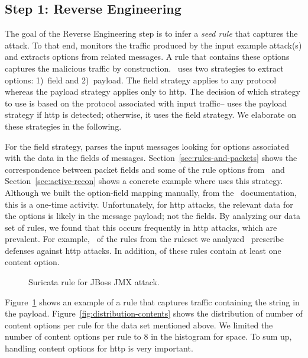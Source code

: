 \documentclass[conference]{IEEEtran}
\begin{document}
\subsection{Step 1: Reverse Engineering}
\label{sec:reverse-engineering}

The goal of the Reverse Engineering step is to infer a \emph{seed
  rule} that captures the attack. To that end, \tname{} monitors the
traffic produced by the input example attack(s) and extracts options
from related messages. A rule that contains these options captures the
malicious traffic by construction. \tname\ uses two strategies to
extract options: 1)~field and 2)~payload. The field strategy applies
to any protocol whereas the payload strategy applies only to http.
The decision of which strategy to use is based on the protocol
associated with input traffic--\tname{} uses the payload strategy if
http is detected; otherwise, it uses the field strategy. We elaborate
on these strategies in the following.

For the field strategy, \tname{} parses the input messages looking for
options associated with the data in the fields of
messages. Section~\ref{sec:rules-and-packets} shows the correspondence
between packet fields and some of the rule options from \suri\ and
Section~\ref{sec:active-recon} shows a concrete example where \tname{}
uses this strategy. Although we built the option-field mapping
manually, from the \suri\ documentation, this is a one-time activity.
Unfortunately, for http attacks, the relevant data for the options is
likely in the message payload; not the fields. By analyzing our data
set of rules, we found that this occurs frequently in http attacks,
which are prevalent. For example, \percHttp\ of the \numrulessuri{}
rules from the ruleset we analyzed~\cite{emerging-threats-open}
prescribe defenses against http attacks. In addition,
\percRulesWithContent{} of these rules contain at least one content
option.

\begin{figure}[h!]
  
  \vspace{-1ex}  
  \caption{Suricata rule for JBoss JMX attack.}
  \vspace{-2ex}  
  \label{fig:adaptor-golden-rule.suricata}
\end{figure}

Figure~\ref{fig:adaptor-golden-rule.suricata} shows an example of a rule that
captures traffic containing the string  in the
payload.  Figure~\ref{fig:distribution-contents} shows the
distribution of number of content options per rule for the data set
mentioned above. We limited the number of content options per rule to
8 in the histogram for space.   To sum up, handling
content options for http is very important.
\end{document}
